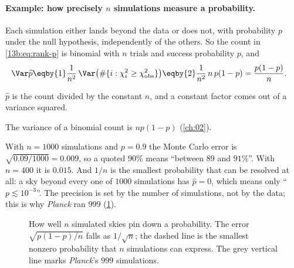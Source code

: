 \paragraph{Example: how precisely $n$ simulations measure a probability.} Each simulation either lands beyond
the data or does not, with probability $p$ under the null hypothesis, independently of the others. So the
count in \eqref{13b:eq:rank-p} is binomial with $n$ trials and success probability $p$, and
\begin{align*}
  \Var\widehat p
  &\eqby{1}\frac{1}{n^2}\,\Var\bigl(\#\{i:\chi^2_i\ge\chi^2_{\rm obs}\}\bigr)
   \eqby{2}\frac{1}{n^2}\,n\,p(1-p)
   =\frac{p(1-p)}{n}.
\end{align*}
\begin{explain}
  \item $\widehat p$ is the count divided by the constant $n$, and a constant factor comes out of a variance
        squared.
  \item The variance of a binomial count is $np(1-p)$ (\cref{ch:02}).
\end{explain}
With $n=1000$ simulations and $p=0.9$ the Monte Carlo error is $\sqrt{0.09/1000}=0.009$, so a
quoted $90\%$ means ``between $89$ and $91\%$''. With $n=400$ it is $0.015$. And $1/n$ is the smallest
probability that can be resolved at all: a sky beyond every one of $1000$ simulations has $\widehat p=0$, which
means only ``$p\lesssim10^{-3}$''. The precision is set by the number of simulations, not by the data; this is
why \textit{Planck} ran $999$ (\cref{13b:fig:perr}).

\begin{figure}[htbp]
\centering
{}
\caption{How well $n$ simulated skies pin down a probability. The error $\sqrt{p(1-p)/n}$ falls as $1/\sqrt n$;
the dashed line is the smallest nonzero probability that $n$ simulations can express. The grey vertical line
marks \textit{Planck}'s $999$ simulations.}
\label{13b:fig:perr}
\end{figure}

